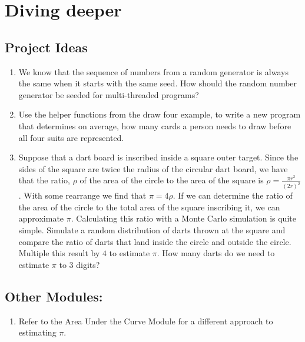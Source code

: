 \documentclass[a4paper, 11pt]{article}
\begin{document}
\section{Diving deeper}

\subsection{Project Ideas}
\begin{enumerate}
\item We know that the sequence of numbers from a random generator is always the same when it starts with the same seed. How should the random number generator be seeded for multi-threaded programs?

\item Use the helper functions from the draw four example, to write a new program that determines on average, how many cards a person needs to draw before all four suits are represented.

\item Suppose that a dart board is inscribed inside a square outer target. Since the sides of the square are twice the radius of the circular dart board, we have that the ratio, $\rho$ of the area of the circle to the area of the square is $\rho = \frac{\pi {r}^2}{{\left( 2r \right)^2}}$. With some rearrange we find that $\pi = 4\rho$. If we can determine the ratio of the area of the circle to the total area of the square inscribing it, we can approximate $\pi$. Calculating this ratio with a Monte Carlo simulation is quite simple. Simulate a random distribution of darts thrown at the square and compare the ratio of darts that land inside the circle and outside the circle. Multiple this result by $4$ to estimate $\pi$. How many darts do we need to estimate $\pi$ to 3 digits?

\end{enumerate}
\subsection{Other Modules:}

\begin{enumerate}
\item Refer to the Area Under the Curve Module for a different approach to estimating $\pi$.
\end{enumerate}





\end{document}
